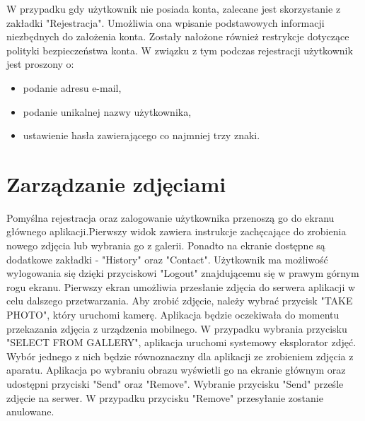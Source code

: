 {W przypadku gdy użytkownik nie posiada konta, zalecane jest skorzystanie z zakładki "Rejestracja". Umożliwia ona wpisanie podstawowych informacji niezbędnych do założenia konta. Zostały nałożone również restrykcje dotyczące polityki bezpieczeństwa konta. W związku z tym podczas rejestracji użytkownik jest proszony o:
\begin{itemize}[noitemsep]
	\item podanie adresu e-mail,
	\item podanie unikalnej nazwy użytkownika,
	\item ustawienie hasła zawierającego co najmniej trzy znaki.
\end{itemize} 
}
\newpage
\section{Zarządzanie zdjęciami}{

Pomyślna rejestracja oraz zalogowanie użytkownika przenoszą go do ekranu głównego aplikacji.Pierwszy widok zawiera instrukcje zachęcające do zrobienia nowego zdjęcia lub wybrania go z galerii. Ponadto na ekranie dostępne są dodatkowe zakładki - "History" oraz "Contact". Użytkownik ma możliwość wylogowania się dzięki przyciskowi "Logout" znajdującemu się w prawym górnym rogu ekranu. Pierwszy ekran umożliwia przesłanie zdjęcia do serwera aplikacji w celu dalszego przetwarzania. Aby zrobić zdjęcie, należy wybrać przycisk "TAKE PHOTO", który uruchomi kamerę. Aplikacja będzie oczekiwała do momentu przekazania zdjęcia z urządzenia mobilnego. W przypadku wybrania przycisku "SELECT FROM GALLERY", aplikacja uruchomi systemowy eksplorator zdjęć. Wybór jednego z nich będzie równoznaczny dla aplikacji ze zrobieniem zdjęcia z aparatu. Aplikacja po wybraniu obrazu wyświetli go na ekranie głównym oraz udostępni przyciski "Send" oraz "Remove". Wybranie przycisku "Send" prześle zdjęcie na serwer. W przypadku przycisku "Remove" przesyłanie zostanie anulowane.

}
